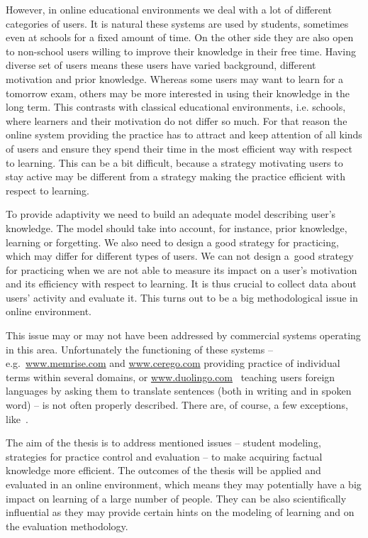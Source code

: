 \documentclass[table,color,cover,twoside,nolot,nolof]{fithesis3/fithesis3}
\begin{document}
However, in online educational environments we deal with a lot of different
categories of users. It is natural these systems are used by students,
sometimes even at schools for a fixed amount of time. On the other side they
are also open to non-school users willing to improve their knowledge in their
free time. Having diverse set of users means these users have varied
background, different motivation and prior knowledge. Whereas some users may want to
learn for a tomorrow exam, others may be more interested in using their
knowledge in the long term. This contrasts with classical educational
environments, i.e. schools, where learners and their motivation do not differ
so much. For that reason the online system providing the practice has to
attract and keep attention of all kinds of users and ensure they spend
their time in the most efficient way with respect to learning. This can be a
bit difficult, because a strategy motivating users to stay active may be
different from a strategy making the practice efficient with respect to
learning.

To provide adaptivity we need to build an adequate model describing user's
knowledge. The model should take into account, for instance, prior knowledge, learning or
forgetting. We also need to design a good strategy for practicing, which may
differ for different types of users. We can not design a~good strategy for
practicing when we are not able to measure its impact on a user's motivation and
its efficiency with respect to learning. It is thus crucial to collect data
about users' activity and evaluate it. This turns out to be a big
methodological issue in online environment.

This issue may or may not have been addressed by commercial systems operating
in this area. Unfortunately the functioning of these systems --
e.g.~\url{www.memrise.com} and \url{www.cerego.com} providing practice of
individual terms within several domains, or
\url{www.duolingo.com}~\cite{garcia2013learning} teaching users foreign
languages by asking them to translate sentences (both in writing and in spoken
word) -- is not often properly described. There are, of course, a few
exceptions, like~\cite{streeter2015mixture}.

The aim of the thesis is to address mentioned issues -- student modeling,
strategies for practice control and evaluation -- to make acquiring factual
knowledge more efficient. The outcomes of the thesis will be applied and
evaluated in an online environment, which means they may potentially have a big
impact on learning of a large number of people. They can be also scientifically
influential as they may provide certain hints on the modeling of learning and
on the evaluation methodology.
\end{document}

